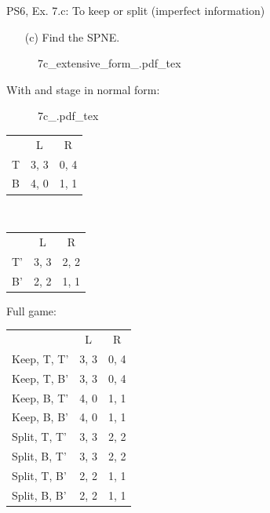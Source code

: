 \begin{frame}{PS6, Ex. 7.c: To keep or split (imperfect information)}
    \begin{itemize}
      \item[(c)] Find the SPNE.
    \end{itemize}
    \vspace{-16pt}
    \begin{figure}[!h]
      \center
      \def\svgwidth{.8\columnwidth}
      {7c_extensive_form_.pdf_tex}
    \end{figure}
    \vspace{-8pt}
    \begin{multicols}{2}
      With  and  stage in normal form:
      \vspace{-4pt}
      \begin{figure}[!h]
        \center
        \def\svgwidth{.5\columnwidth}
        {7c_.pdf_tex}
      \end{figure}
      \vspace{-9pt}
      \begin{table}
        \begin{tabular}{l|c|c|}
          \multicolumn{1}{c}{} & \multicolumn{1}{c}{L} & \multicolumn{1}{c}{R} \\\cline{2-3}
          T & 3, 3 & 0, 4 \\\cline{2-3}
          B & 4, 0 & 1, 1 \\\cline{2-3}
        \end{tabular}\
        \begin{tabular}{l|c|c|}
          \multicolumn{1}{c}{} & \multicolumn{1}{c}{L} & \multicolumn{1}{c}{R} \\\cline{2-3}
          T' & 3, 3 & 2, 2 \\\cline{2-3}
          B' & 2, 2 & 1, 1 \\\cline{2-3}
        \end{tabular}
      \end{table}
    \vfill\null \columnbreak
    Full game:
    \vspace{-16pt}
    \begin{table}
      \begin{tabular}{l|c|c|}
        \multicolumn{1}{c}{} & \multicolumn{1}{c}{L} & \multicolumn{1}{c}{R} \\\cline{2-3}
        Keep, T, T' & 3, 3 & 0, 4 \\\cline{2-3}
        Keep, T, B' & 3, 3 & 0, 4 \\\cline{2-3}
        Keep, B, T' & 4, 0 & 1, 1 \\\cline{2-3}
        Keep, B, B' & 4, 0 & 1, 1 \\\cline{2-3}
        Split, T, T' & 3, 3 & 2, 2 \\\cline{2-3}
        Split, B, T' & 3, 3 & 2, 2 \\\cline{2-3}
        Split, T, B' & 2, 2 & 1, 1 \\\cline{2-3}
        Split, B, B' & 2, 2 & 1, 1 \\\cline{2-3}
      \end{tabular}
    \end{table}
    \vfill\null
  \end{multicols}
\end{frame}
